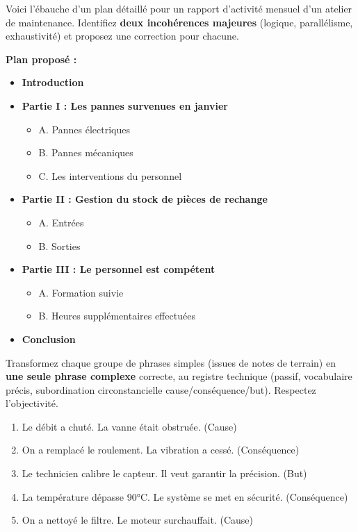 \documentclass[11pt]{article}
\newcounter{popsec}
\newcounter{popsub}
\newcommand{\courssub}[1]{%
  \stepcounter{popsub}%
  \par\vspace{9pt}\noindent{\popxbold\fontsize{11.5}{13}\selectfont\color{popink}{\color{poporange}\thepopsec.\thepopsub}\hspace{6pt}#1}\par\nopagebreak\vspace{4pt}
}
\begin{document}
\begin{exercice}
Voici l'ébauche d'un plan détaillé pour un rapport d'activité mensuel d'un atelier de maintenance. Identifiez \textbf{deux incohérences majeures} (logique, parallélisme, exhaustivité) et proposez une correction pour chacune.

\textbf{Plan proposé :}
\begin{itemize}
    \item \textbf{Introduction}
    \item \textbf{Partie I : Les pannes survenues en janvier}
        \begin{itemize}
            \item A. Pannes électriques
            \item B. Pannes mécaniques
            \item C. Les interventions du personnel
        \end{itemize}
    \item \textbf{Partie II : Gestion du stock de pièces de rechange}
        \begin{itemize}
            \item A. Entrées
            \item B. Sorties
        \end{itemize}
    \item \textbf{Partie III : Le personnel est compétent}
        \begin{itemize}
            \item A. Formation suivie
            \item B. Heures supplémentaires effectuées
        \end{itemize}
    \item \textbf{Conclusion}
\end{itemize}
\end{exercice}

\courssub{Je m'entraîne}

\begin{exercice}
Transformez chaque groupe de phrases simples (issues de notes de terrain) en \textbf{une seule phrase complexe} correcte, au registre technique (passif, vocabulaire précis, subordination circonstancielle cause/conséquence/but). Respectez l'objectivité.

\begin{enumerate}
    \item Le débit a chuté. La vanne était obstruée. (Cause)
    \item On a remplacé le roulement. La vibration a cessé. (Conséquence)
    \item Le technicien calibre le capteur. Il veut garantir la précision. (But)
    \item La température dépasse 90°C. Le système se met en sécurité. (Conséquence)
    \item On a nettoyé le filtre. Le moteur surchauffait. (Cause)
\end{enumerate}
\end{exercice}
\end{document}
